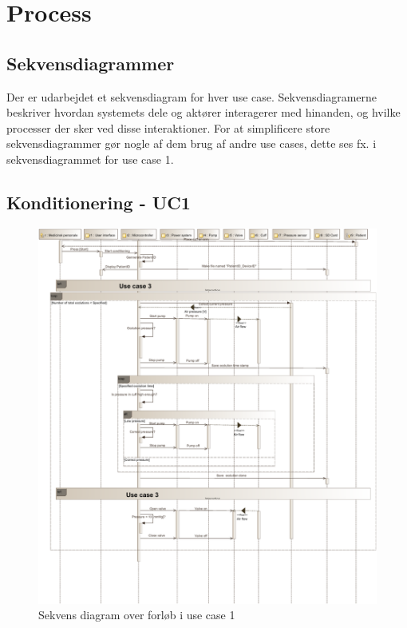 \newpage
\section{Process}

\subsection{Sekvensdiagrammer}
Der er udarbejdet et sekvensdiagram for hver use case. Sekvensdiagramerne beskriver hvordan systemets dele og aktører interagerer med hinanden, og hvilke processer der sker ved disse interaktioner. 
For at simplificere store sekvensdiagrammer gør nogle af dem brug af andre use cases, dette ses fx. i sekvensdiagrammet for use case 1. 

\subsection{Konditionering - UC1} \hfil
\begin{figure}[H]
	\includegraphics[width=\textwidth ]{pdfs/SD_UC1-crop.pdf}
	\caption{Sekvens diagram over forløb i use case 1}
\end{figure}
\newpage


